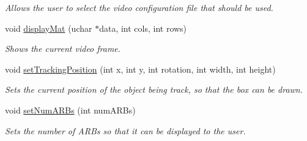 \begin{DoxyCompactItemize}
\begin{DoxyCompactList}\small\item\em Allows the user to select the video configuration file that should be used. \end{DoxyCompactList}\item 
void \hyperlink{class_qt_widget_image_display_a67a3b1543b70d23c30c73b571a778cf2}{display\+Mat} (uchar $\ast$data, int cols, int rows)
\begin{DoxyCompactList}\small\item\em Shows the current video frame. \end{DoxyCompactList}\item 
void \hyperlink{class_qt_widget_image_display_a2f224c2a74780308829f77f915f82af5}{set\+Tracking\+Position} (int x, int y, int rotation, int width, int height)
\begin{DoxyCompactList}\small\item\em Sets the current position of the object being track, so that the box can be drawn. \end{DoxyCompactList}\item 
void \hyperlink{class_qt_widget_image_display_ad0e8669aaa03e5d49a9e9d63ee76655b}{set\+Num\+A\+R\+Bs} (int num\+A\+R\+Bs)
\begin{DoxyCompactList}\small\item\em Sets the number of A\+R\+Bs so that it can be displayed to the user. \end{DoxyCompactList}\end{DoxyCompactItemize}
